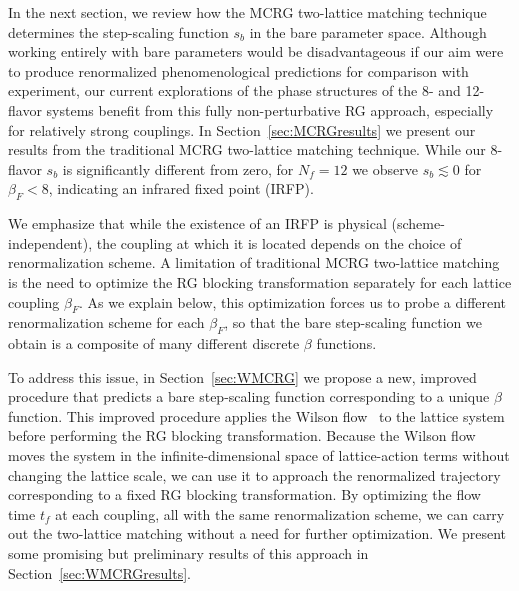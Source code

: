 \documentclass{PoS}
\newcommand{\be}{\ensuremath{\beta} }
\newcommand{\lsim}{\ensuremath{\lesssim} }
\newcommand{\secref}[1]{Section~\ref{#1}}
\begin{document}
In the next section, we review how the MCRG two-lattice matching technique determines the step-scaling function $s_b$ in the bare parameter space.
Although working entirely with bare parameters would be disadvantageous if our aim were to produce renormalized phenomenological predictions for comparison with experiment, our current explorations of the phase structures of the 8- and 12-flavor systems benefit from this fully non-perturbative RG approach, especially for relatively strong couplings.
In \secref{sec:MCRGresults} we present our results from the traditional MCRG two-lattice matching technique.
While our 8-flavor $s_b$ is significantly different from zero, for $N_f = 12$ we observe $s_b \lsim 0$ for $\be_F < 8$, indicating an infrared fixed point (IRFP).

We emphasize that while the existence of an IRFP is physical (scheme-independent), the coupling at which it is located depends on the choice of renormalization scheme.
A limitation of traditional MCRG two-lattice matching is the need to optimize the RG blocking transformation separately for each lattice coupling $\be_F$.
As we explain below, this optimization forces us to probe a different renormalization scheme for each $\be_F$, so that the bare step-scaling function we obtain is a composite of many different discrete \be functions.

To address this issue, in \secref{sec:WMCRG} we propose a new, improved procedure that predicts a bare step-scaling function corresponding to a unique \be function.
This improved procedure applies the Wilson flow~\cite{Narayanan:2006rf, Luscher:2010iy} to the lattice system before performing the RG blocking transformation.
Because the Wilson flow moves the system in the infinite-dimensional space of lattice-action terms without changing the lattice scale, we can use it to approach the renormalized trajectory corresponding to a fixed RG blocking transformation.
By optimizing the flow time $t_f$ at each coupling, all with the same renormalization scheme, we can carry out the two-lattice matching without a need for further optimization.
We present some promising but preliminary results of this approach in \secref{sec:WMCRGresults}.



\end{document}

